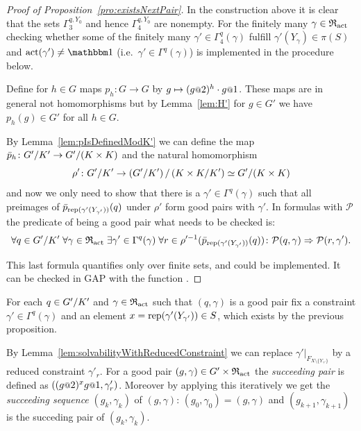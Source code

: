 \documentclass[a4paper,11pt]{amsart}
\begin{document}
\begin{proof}[Proof of Proposition~\ref{pro:existsNextPair}]
 In the construction above it is clear that the sets $\Gamma_3^{q,Y_0}$ and hence $\Gamma_4^{q,Y_0}$
 are nonempty. For the finitely many $\gamma\in \mathfrak{R}_{\operatorname{act}}$ checking whether some of the finitely many 
 $\gamma'\in\Gamma_4^{q}(\gamma)$ fulfill 
 $\gamma'(Y_\gamma) \in \pi(S)$ and $\act(\gamma')\neq\id$ 
 (i.e.\ $\gamma' \in\Gamma^{q}(\gamma)$) is implemented in the procedure below.
 
 
  Define for $h\in G$ maps $p_h\colon G\to G$ by 
  $g\mapsto (g\at{2})^{h}\cdot g\at{1}$. These maps are in general not
   homomorphisms but   %
  by Lemma~\ref{lem:H'} for $g\in G'$ we have $p_h(g)\in G'$ for all $h\in G$. 
 
  By Lemma~\ref{lem:pIsDefinedModK'} we can define the map $\bar p_h\colon {G'/K'} \to {G'/(K\times K)}$
 and the natural homomorphism \[\rho'\colon {G'/K'} \to {\left({G'/K'}\right)/\left({K\times K/K'}\right)} \simeq {G'/(K\times K)} \]
 and now we only need to show that there is a $\gamma'\in\Gamma^q(\gamma)$ such that all preimages of $\bar p_{\operatorname{rep}(\gamma'(Y_{\gamma'}))}(q)$ under $\rho'$ 
 form good pairs with $\gamma'$. In formulas with $\mathcal{P}$ the predicate of being a good pair what needs to be checked is: 
 \[\forall q\in{G'/K'}\;
      \forall \gamma\in\mathfrak{R}_{\operatorname{act}} \;
	 \exists \gamma'\in \Gamma^q(\gamma)\;
	    \forall r\in \rho'^{-1}(\bar p_{\operatorname{rep}(\gamma'(Y_{\gamma'}))}(q))\colon
	      \mathcal{P}(q,\gamma) \Rightarrow \mathcal{P}(r,\gamma').\]
 
 This last formula quantifies only over finite sets, and could be implemented. It can be checked in GAP with the function . 
 \end{proof}

 \begin{defi}
 For each $q\in{G'/K'}$ and $\gamma\in \mathfrak{R}_{\operatorname{act}}$ such that $(q,\gamma)$ is a good pair
 fix a constraint $\gamma'\in\Gamma^q(\gamma)$ and an element 
 $x=\operatorname{rep}(\gamma'(Y_{\gamma'}))\in S$, which exists by the previous proposition.
 
 By Lemma~\ref{lem:solvabilityWithReducedConstraint} we can replace $\gamma'|_{F_{X\setminus\{Y_{\gamma'}\}}}$ by a reduced constraint $\gamma'_r$. 
 For a good pair $(g,\gamma)\in G'\times\mathfrak{R}_{\operatorname{act}}$ the \emph{succeeding pair} is defined as $\left((g\at{2})^xg\at{1},\gamma'_r\right)$.
 Moreover by applying this iteratively we get the \emph{succeeding sequence} $(g_k,\gamma_k)$ of $(g,\gamma)$: $(g_0,\gamma_0)=(g,\gamma)$ and $(g_{k+1},\gamma_{k+1})$ is the succeding pair of $(g_k,\gamma_k)$.
 \end{defi}
\end{document}
